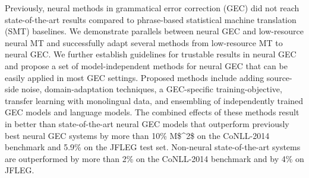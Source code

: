 Previously, neural methods in grammatical error correction (GEC) did not reach state-of-the-art results compared to phrase-based statistical machine translation (SMT) baselines. We demonstrate parallels between neural GEC and low-resource neural MT and successfully adapt several methods from low-resource MT to neural GEC. We further establish guidelines for trustable results in neural GEC and propose a set of model-independent methods for neural GEC that can be easily applied in most GEC settings. Proposed methods include adding source-side noise, domain-adaptation techniques, a GEC-specific training-objective, transfer learning with monolingual data, and ensembling of independently trained GEC models and language models. The combined effects of these methods result in better than state-of-the-art neural GEC models that outperform previously best neural GEC systems by more than 10\% M\$^2\$ on the CoNLL-2014 benchmark and 5.9\% on the JFLEG test set. Non-neural state-of-the-art systems are outperformed by more than 2\% on the CoNLL-2014 benchmark and by 4\% on JFLEG.
